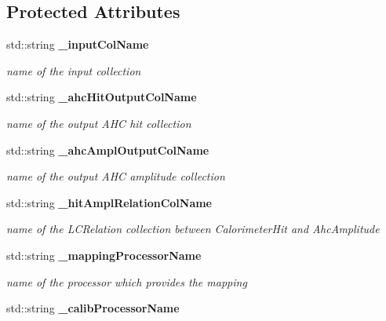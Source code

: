 \subsection*{Protected Attributes}
\begin{DoxyCompactItemize}
\item 
std::string {\bf \_\-inputColName}\label{classCALICE_1_1SiPMCalibrateProcessor_a57a43fb9e621a67f048f8d7e3eb422fc}

\begin{DoxyCompactList}\small\item\em name of the input collection \item\end{DoxyCompactList}\item 
std::string {\bf \_\-ahcHitOutputColName}\label{classCALICE_1_1SiPMCalibrateProcessor_aab19ab03aed4e1d2c55517553b01a7bf}

\begin{DoxyCompactList}\small\item\em name of the output AHC hit collection \item\end{DoxyCompactList}\item 
std::string {\bf \_\-ahcAmplOutputColName}\label{classCALICE_1_1SiPMCalibrateProcessor_ab050d98ccbef256701d52f6bcdbe7360}

\begin{DoxyCompactList}\small\item\em name of the output AHC amplitude collection \item\end{DoxyCompactList}\item 
std::string {\bf \_\-hitAmplRelationColName}\label{classCALICE_1_1SiPMCalibrateProcessor_a48052d44b45a93f7d1e247e844f311b6}

\begin{DoxyCompactList}\small\item\em name of the LCRelation collection between CalorimeterHit and AhcAmplitude \item\end{DoxyCompactList}\item 
std::string {\bf \_\-mappingProcessorName}\label{classCALICE_1_1SiPMCalibrateProcessor_a17f68ea31684ff76170b3878eefb1558}

\begin{DoxyCompactList}\small\item\em name of the processor which provides the mapping \item\end{DoxyCompactList}\item 
std::string {\bf \_\-calibProcessorName}\label{classCALICE_1_1SiPMCalibrateProcessor_a0b8de01a32b442f302706d5678b0bed7}


\end{DoxyCompactItemize}
